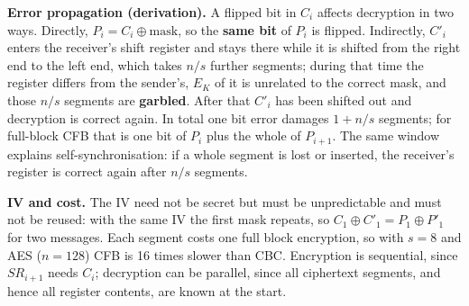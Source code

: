 \begin{center}
\end{center}

\textbf{Error propagation (derivation).} A flipped bit in $C_i$ affects decryption in two ways. Directly, $P_i = C_i \oplus \text{mask}$, so the \textbf{same bit} of $P_i$ is flipped. Indirectly, $C'_i$ enters the receiver's shift register and stays there while it is shifted from the right end to the left end, which takes $n/s$ further segments; during that time the register differs from the sender's, $E_K$ of it is unrelated to the correct mask, and those $n/s$ segments are \textbf{garbled}. After that $C'_i$ has been shifted out and decryption is correct again. In total one bit error damages $1 + n/s$ segments; for full-block CFB that is one bit of $P_i$ plus the whole of $P_{i+1}$. The same window explains self-synchronisation: if a whole segment is lost or inserted, the receiver's register is correct again after $n/s$ segments.

\textbf{IV and cost.} The IV need not be secret but must be unpredictable and must not be reused: with the same IV the first mask repeats, so $C_1 \oplus C'_1 = P_1 \oplus P'_1$ for two messages. Each segment costs one full block encryption, so with $s = 8$ and AES ($n = 128$) CFB is 16 times slower than CBC. Encryption is sequential, since $SR_{i+1}$ needs $C_i$; decryption can be parallel, since all ciphertext segments, and hence all register contents, are known at the start.

